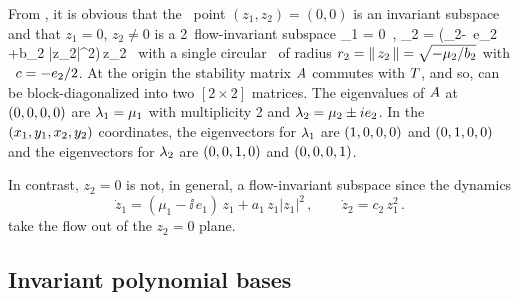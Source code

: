 From , it is obvious that the \eqv\ point \((z_1,z_2)=(0,0)\)
is an invariant subspace and that $z_1=0$, $z_2 \neq 0$ is a 2\dmn\
flow-invariant subspace
\beq
  _1 = 0 %
\,,\qquad
  _2 = (\mu_2-\ii\, e_2 +b_2 |z_2|^2)\,{z_2} %
\,
with a single circular \reqv\ of radius $r_2 = \norm{z_2} = \sqrt{-\mu_2/b_2}$ with
\phaseVel\ $\velRel=-e_2/2$. At the origin the stability matrix $\Mvar$ commutes with $\Lg$,
and so, can be block-diagonalized into two $[2\!\times\!2]$ matrices.
The eigenvalues of $\Mvar$ at $\cartpt{0,0,0,0}$ are $\Lyap_1 = \mu_1$ with multiplicity 2 and
$\Lyap_2 = \mu_2 \pm i e_2$. In the $\cartpt{x_1,y_1,x_2,y_2}$ coordinates, the eigenvectors for $\Lyap_1$ are $\cartpt{1,0,0,0}$ and
$\cartpt{0,1,0,0}$ and the eigenvectors for $\Lyap_2$
are $\cartpt{0,0,1,0}$ and $\cartpt{0,0,0,1}$.

In contrast, $z_2 =0$ is not, in general, a flow-invariant subspace since the dynamics
\[
  \dot{z}_1 = (\mu_1-\ii\, e_1)\,z_1+a_1\,z_1|z_1|^2
\,,\qquad
  \dot{z}_2 = c_2\,z_1^2
\,.
\]
take the flow out of the $z_2 =0$ plane.


\subsection{Invariant polynomial bases}
\label{s:invPol}

